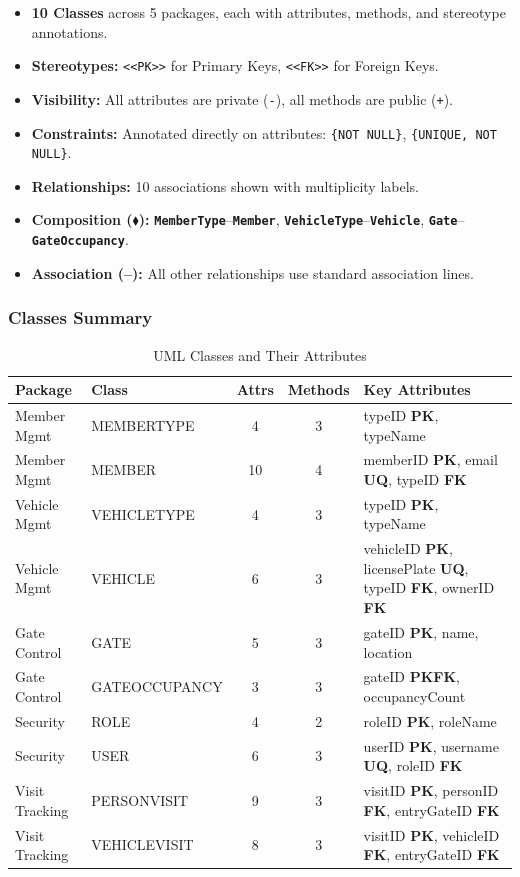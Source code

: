 \documentclass[a4paper, 12pt]{article}
\newcommand{\entityname}[1]{\texttt{\textbf{#1}}}
\newcommand{\pkmark}{\textcolor{iitgnblue}{\textbf{PK}}}
\newcommand{\fkmark}{\textcolor{criticalred}{\textbf{FK}}}
\newcommand{\uqmark}{\textcolor{codepurple}{\textbf{UQ}}}
\begin{document}
\begin{itemize}[leftmargin=*, nosep]
    \item \textbf{10 Classes} across 5 packages, each with attributes, methods, and stereotype annotations.
    \item \textbf{Stereotypes:} \texttt{<<PK>>} for Primary Keys, \texttt{<<FK>>} for Foreign Keys.
    \item \textbf{Visibility:} All attributes are private (\texttt{-}), all methods are public (\texttt{+}).
    \item \textbf{Constraints:} Annotated directly on attributes: \texttt{\{NOT NULL\}}, \texttt{\{UNIQUE, NOT NULL\}}.
    \item \textbf{Relationships:} 10 associations shown with multiplicity labels.
    \item \textbf{Composition ($\blacklozenge$):} \entityname{MemberType}--\entityname{Member}, \entityname{VehicleType}--\entityname{Vehicle}, \entityname{Gate}--\entityname{GateOccupancy}.
    \item \textbf{Association (--):} All other relationships use standard association lines.
\end{itemize}

\subsubsection{Classes Summary}

\begin{table}[H]
\centering
\caption{UML Classes and Their Attributes}
\label{tab:uml-classes}
\small
\begin{tabularx}{\textwidth}{l l c c X}
\toprule
\textbf{Package} & \textbf{Class} & \textbf{Attrs} & \textbf{Methods} & \textbf{Key Attributes} \\
\midrule
Member Mgmt & MEMBERTYPE & 4 & 3 & typeID \pkmark, typeName \\
Member Mgmt & MEMBER & 10 & 4 & memberID \pkmark, email \uqmark, typeID \fkmark \\
Vehicle Mgmt & VEHICLETYPE & 4 & 3 & typeID \pkmark, typeName \\
Vehicle Mgmt & VEHICLE & 6 & 3 & vehicleID \pkmark, licensePlate \uqmark, typeID \fkmark, ownerID \fkmark \\
Gate Control & GATE & 5 & 3 & gateID \pkmark, name, location \\
Gate Control & GATEOCCUPANCY & 3 & 3 & gateID \pkmark\fkmark, occupancyCount \\
Security & ROLE & 4 & 2 & roleID \pkmark, roleName \\
Security & USER & 6 & 3 & userID \pkmark, username \uqmark, roleID \fkmark \\
Visit Tracking & PERSONVISIT & 9 & 3 & visitID \pkmark, personID \fkmark, entryGateID \fkmark \\
Visit Tracking & VEHICLEVISIT & 8 & 3 & visitID \pkmark, vehicleID \fkmark, entryGateID \fkmark \\
\bottomrule
\end{tabularx}
\end{table}
\end{document}
